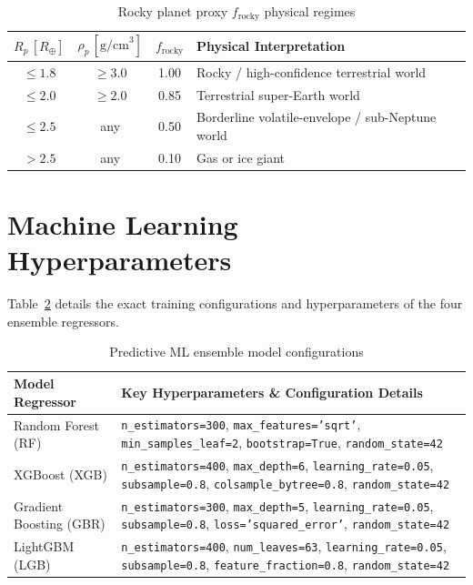 \documentclass[11pt,a4paper]{article}
\begin{document}
\begin{table}[H]
\centering
\caption{Rocky planet proxy $f_{\text{rocky}}$ physical regimes}
\label{tab:app_rocky_proxy}
\begin{tabular}{cccl}
\toprule
$R_p\,[R_\oplus]$ & $\rho_p\,[\text{g/cm}^3]$ & $f_{\text{rocky}}$ & Physical Interpretation \\
\midrule
$\leq 1.8$ & $\geq 3.0$ & 1.00 & Rocky / high-confidence terrestrial world \\
$\leq 2.0$ & $\geq 2.0$ & 0.85 & Terrestrial super-Earth world \\
$\leq 2.5$ & any & 0.50 & Borderline volatile-envelope / sub-Neptune world \\
$> 2.5$    & any & 0.10 & Gas or ice giant \\
\bottomrule
\end{tabular}
\end{table}

\newpage

\section{Machine Learning Hyperparameters}
\label{app:hyperparams}

Table~\ref{tab:app_hyperparams} details the exact training configurations and hyperparameters of the four ensemble regressors.

\begin{table}[H]
\centering
\caption{Predictive ML ensemble model configurations}
\label{tab:app_hyperparams}
\begin{tabular}{lp{11cm}}
\toprule
Model Regressor & Key Hyperparameters \& Configuration Details \\
\midrule
Random Forest (RF) & \texttt{n\_estimators=300}, \texttt{max\_features='sqrt'}, \texttt{min\_samples\_leaf=2}, \texttt{bootstrap=True}, \texttt{random\_state=42} \\
XGBoost (XGB) & \texttt{n\_estimators=400}, \texttt{max\_depth=6}, \texttt{learning\_rate=0.05}, \texttt{subsample=0.8}, \texttt{colsample\_bytree=0.8}, \texttt{random\_state=42} \\
Gradient Boosting (GBR) & \texttt{n\_estimators=300}, \texttt{max\_depth=5}, \texttt{learning\_rate=0.05}, \texttt{subsample=0.8}, \texttt{loss='squared\_error'}, \texttt{random\_state=42} \\
LightGBM (LGB) & \texttt{n\_estimators=400}, \texttt{num\_leaves=63}, \texttt{learning\_rate=0.05}, \texttt{subsample=0.8}, \texttt{feature\_fraction=0.8}, \texttt{random\_state=42} \\
\bottomrule
\end{tabular}
\end{table}
\end{document}
